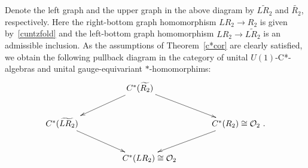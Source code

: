 \documentclass[12pt,times,a4paper]{amsart}
\numberwithin{equation}{section}
\numberwithin{equation}{section}
\begin{document}
Denote the left graph and the upper graph in the above diagram by $\widetilde{LR_2}$ and $\widetilde{R_2}$, respectively. 
Here the right-bottom graph homomorphism $LR_2\to R_2$ is given 
by~\eqref{cuntzfold} and the left-bottom graph homomorphism $LR_2\to \widetilde{LR_2}$ is an admissible inclusion. 
As the assumptions of Theorem~\ref{c*cor} are clearly satisfied, we obtain the following pullback diagram in the category of unital 
$U(1)$-C*-algebras and unital gauge-equivariant $*$-homomorphims:
\begin{equation}
\xymatrix{
& C^*(\widetilde{R_2}) \ar[dl] \ar[dr]&\\
C^*(\widetilde{LR_2}) \ar[dr] & & \phantom{\mathcal{O}_2 }C^*(R_2)\cong\mathcal{O}_2 \ar[dl]~.\\
& \phantom{\cong\mathcal{O}_2 }C^*(LR_2)\cong\mathcal{O}_2 &
}
\end{equation}
\end{document}
